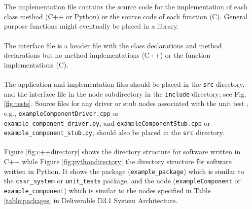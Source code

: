 \documentclass{CSSRforAfrica}
\newcommand{\blank}{~\\}
\begin{document}
\begin{appendices}
\blank
~
\blank
The implementation file contains the source code for the implementation of each class method (C++ or Python) or the source code of each function (C). General purpose functions might eventually be placed in a library.  
\blank
~
\blank
The interface file  is a header file with the class declarations and method  declarations but no method implementations (C++) or  the function  implementations (C). 
\blank
~
\blank
The application and implementation files should be placed in the {\small \verb+src+}  directory, and the interface file in the node subdirectory in the {\small \verb+include+} directory; see Fig. \ref{fig:tests}. Source files for any driver or stub nodes associated with the unit test , e.g., {\small \verb+exampleComponentDriver.cpp+} or \\ {\small \verb+example_component_driver.py+}, and {\small \verb+exampleComponentStub.cpp+}  or \\{\small \verb+example_component_stub.py+}, should also be placed in the {\small \verb+src+}  directory.
\blank
~
\blank
Figure \ref{fig:c++directory}  shows the directory structure for software written in C++ while Figure \ref{fig:pythondirectory}  the directory structure for software written in Python. It shows the package (\verb+example_package+) which is similar to the \verb+cssr_system+ or \verb+unit_tests+ package, and the node (\verb+exampleComponent+ or \verb+example_component+) which is similar to the nodes specified in Table \ref{table:packages} in Deliverable D3.1 System Architecture.

\newpage

\begin{figure}[thb]
 
\begin{multicols}{3}

~~~~~~~~~~~~~~~~~~~~~

\vspace{20cm}

\columnbreak

{\small 
{}
}
\columnbreak



\end{multicols}
\end{figure}
\end{appendices}
\end{document}
